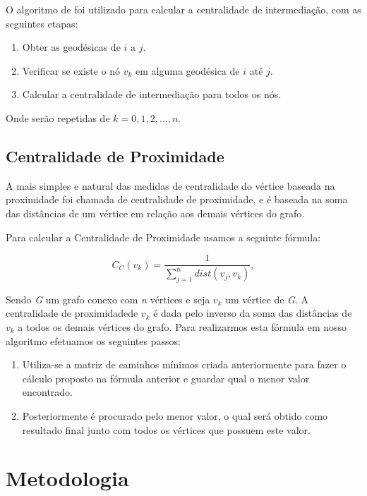 \documentclass[12pt]{article}
\begin{document}
O algoritmo de \cite{Brandes01afaster} foi utilizado para calcular a centralidade de intermediação, com as seguintes etapas:
\begin{enumerate}
\item Obter as geodésicas de $i$ a $j$.
\item Verificar se existe o nó $v_k$ em alguma geodésica de $i$ até $j$.
\item Calcular a centralidade de intermediação para todos os nós.
\end{enumerate}
Onde serão repetidas de $k = 0,1,2,\dots,n$.

\subsection{Centralidade de Proximidade}
A mais simples e natural das medidas de centralidade do vértice baseada na proximidade foi chamada de centralidade de proximidade, e é baseada na soma das distâncias de um  vértice em relação aos demais vértices do grafo\cite{freitas}.

Para calcular a Centralidade de Proximidade usamos a seguinte fórmula:
\begin{center}
\begin{equation}
C_C(v_k)=\frac{1}{\sum\limits_{j = 1}^n dist(v_j,v_k)},
\end{equation}
\end{center}
Sendo {\it G} um grafo conexo com {\it n} vértices e seja $v_k$ um vértice de {\it G}. A centralidade de proximidadede $v_k$ é dada pelo inverso da soma das distâncias de $v_k$ a todos os demais vértices do grafo.
Para realizarmos esta fórmula em nosso algoritmo efetuamos os seguintes passos:
\begin{enumerate}
\item Utiliza-se a matriz de caminhos mínimos criada anteriormente para fazer o cálculo proposto na fórmula anterior e guardar qual o menor valor encontrado.
\item Posteriormente é procurado pelo menor valor, o qual será obtido como resultado final junto com todos os vértices que possuem este valor.
\end{enumerate}

\section{Metodologia}\label{sec:met}
\end{document}
